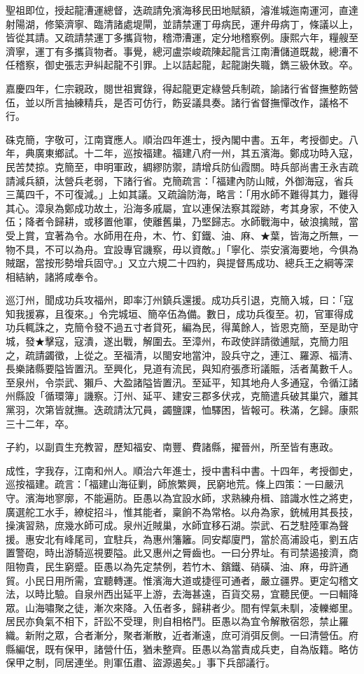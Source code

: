 \begin{pinyinscope}
聖祖即位，授起龍漕運總督，迭疏請免濱海移民田地賦額，濬淮城迤南運河，直達射陽湖，修築濟寧、臨清諸處堤閘，並請禁運丁毋病民，運弁毋病丁，條議以上，皆從其請。又疏請禁運丁多攜貨物，稽滯漕運，定分地稽察例。康熙六年，糧艘至濟寧，運丁有多攜貨物者。事覺，總河盧崇峻疏陳起龍言江南漕儲道既裁，總漕不任稽察，御史張志尹糾起龍不引罪。上以詰起龍，起龍謝失職，鐫三級休致。卒。

嘉慶四年，仁宗親政，閱世祖實錄，得起龍更定綠營兵制疏，諭諸行省督撫整飭營伍，並以所言抽練精兵，是否可仿行，飭妥議具奏。諸行省督撫憚改作，議格不行。

硃克簡，字敬可，江南寶應人。順治四年進士，授內閣中書。五年，考授御史。八年，典廣東鄉試。十二年，巡按福建。福建八府一州，其五濱海。鄭成功時入寇，民苦焚掠。克簡至，申明軍政，綢繆防禦，請增兵防仙霞關。時兵部尚書王永吉疏請減兵額，汰營兵老弱，下諸行省。克簡疏言：「福建內防山賊，外御海寇，省兵三萬四千，不可復減。」上如其議。又疏論防海，略言：「用水師不難得其力，難得其心。漳泉為鄭成功故土，沿海多戚屬，宜以連保法察其蹤跡，考其身家，不使入伍；降者令歸耕，或移置他軍，使離舊巢，乃堅歸志。水師戰海中，破浪擒賊，當受上賞，宜著為令。水師用在舟，木、竹、釘鐵、油、麻、★葉，皆海之所無，一物不具，不可以為舟。宜設專官譏察，毋以資敵。」「寧化、崇安濱海要地，今俱為賊踞，當按形勢增兵固守。」又立六規二十四約，與提督馬成功、總兵王之綱等深相結納，諸將咸奉令。

巡汀州，聞成功兵攻福州，即率汀州鎮兵還援。成功兵引退，克簡入城，曰：「寇知我援寡，且復來。」令完城垣、簡卒伍為備。數日，成功兵復至。初，官軍得成功兵輒誅之，克簡令發不過五寸者貸死，編為民，得萬餘人，皆恩克簡，至是助守城，發★擊寇，寇潰，遂出戰，解圍去。至漳州，布政使詳請徵逋賦，克簡力阻之，疏請蠲徵，上從之。至福清，以閩安地當沖，設兵守之，連江、羅源、福清、長樂諸縣要隘皆置汛。至興化，見道有流民，與知府張彥珩議賑，活者萬數千人。至泉州，令崇武、獺戶、大盈諸隘皆置汛。至延平，知其地舟人多通寇，令循江諸州縣設「循環簿」譏察。汀州、延平、建安三郡多伏戎，克簡遣兵破其巢穴，離其黨羽，次第皆就撫。迭疏請汰冗員，蠲鹽課，恤驛困，皆報可。秩滿，乞歸。康熙三十二年，卒。

子約，以副貢生充教習，歷知福安、南豐、費諸縣，擢晉州，所至皆有惠政。

成性，字我存，江南和州人。順治六年進士，授中書科中書。十四年，考授御史，巡按福建。疏言：「福建山海征剿，師旅繁興，民窮地荒。條上四策：一曰嚴汛守。濱海地寥廓，不能遍防。臣愚以為宜設水師，求熟練舟楫、諳識水性之將吏，廣選舵工水手，繚椗招斗，惟其能者，稟餉不為常格。以舟為家，銃械用其長技，操演習熟，庶幾水師可成。泉州近賊巢，水師宜移石湖。崇武、石芝駐陸軍為聲援。惠安北有峰尾司，宜駐兵，為惠州籓籬。同安鄰廈門，當於高浦設屯，劉五店置警砲，時出游騎巡視要隘。此又惠州之脣齒也。一曰分界址。有司禁遏接濟，商阻物貴，民生窮蹙。臣愚以為先定禁例，若竹木、鑌鐵、硝磺、油、麻，毋許通貿。小民日用所需，宜聽轉運。惟濱海大道或捷徑可通者，嚴立疆界。更定勾稽文法，以時比驗。自泉州西出延平上游，去海甚遠，百貨交易，宜聽民便。一曰輯降眾。山海嘯聚之徒，漸次來降。入伍者多，歸耕者少。間有悍氣未馴，凌轢鄉里。居民亦負氣不相下，訐訟不受理，則自相格鬥。臣愚以為宜令解散宿怨，禁止羅織。新附之眾，合者漸分，聚者漸散，近者漸遠，庶可消弭反側。一曰清營伍。府縣編氓，既有保甲，諸營什伍，猶未整齊。臣愚以為當責成兵吏，自為版籍。略仿保甲之制，同居連坐。則軍伍肅、盜源遏矣。」事下兵部議行。


\end{pinyinscope}
